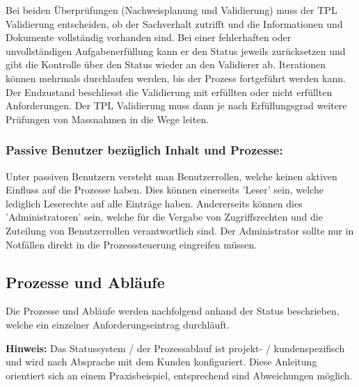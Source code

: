 Bei beiden Überprüfungen (Nachweisplanung und Validierung) muss der TPL Validierung entscheiden, ob der Sachverhalt zutrifft und die Informationen und Dokumente vollständig vorhanden sind. Bei einer fehlerhaften oder unvollständigen Aufgabenerfüllung kann er den Status jeweils zurücksetzen und gibt die Kontrolle über den Status wieder an den Validierer ab. Iterationen können mehrmals durchlaufen werden, bis der Prozess fortgeführt werden kann. \\

Der Endzustand beschliesst die Validierung mit erfüllten oder nicht erfüllten Anforderungen. Der TPL Validierung muss dann je nach Erfüllungsgrad weitere Prüfungen von Massnahmen in die Wege leiten.

\subsubsection{Passive Benutzer bezüglich Inhalt und Prozesse:} 

Unter passiven Benutzern versteht man Benutzerrollen, welche keinen aktiven Einfluss auf die Prozesse haben. Dies können einerseits 'Leser' sein, welche lediglich Leserechte auf alle Einträge haben. Andererseits können dies 'Administratoren' sein, welche für die Vergabe von Zugriffsrechten und die Zuteilung von Benutzerrollen verantwortlich sind. Der Administrator sollte nur in Notfällen direkt in die Prozesssteuerung eingreifen müssen.

\subsection{Prozesse und Abläufe}

Die Prozesse und Abläufe werden nachfolgend anhand der Status beschrieben, welche ein einzelner Anforderungseintrag durchläuft. 

\vspace{\baselineskip}

\textbf{Hinweis:} Das Statussystem / der Prozessablauf ist projekt- / kundenspezifisch und wird nach Absprache mit dem Kunden konfiguriert. Diese Anleitung orientiert sich an einem Praxisbeispiel, entsprechend sind Abweichungen möglich.

\vspace{\baselineskip}

